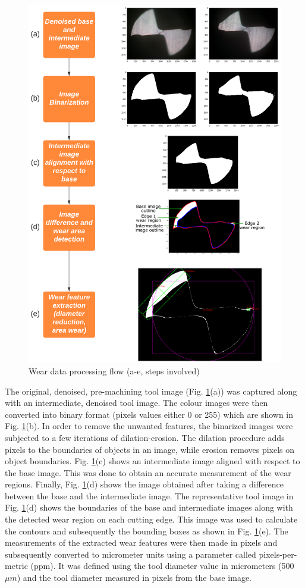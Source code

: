 \documentclass[preprint,review,12pt]{elsarticle}
\begin{document}
\begin{figure}[!h]
\begin{center}
\includegraphics[width=0.7\linewidth]{325.png}
\caption{Wear data processing flow (a-e, steps involved)}\label{fig:fig325}
\end{center}
\end{figure}

The original, denoised, pre-machining tool image (Fig. \ref{fig:fig325}(a)) was captured along with an intermediate, denoised tool image. The colour images were then converted into binary format (pixels values either 0 or 255) which are shown in Fig. \ref{fig:fig325}(b). In order to remove the unwanted features, the binarized images were subjected to a few iterations of dilation-erosion. The dilation procedure adds pixels to the boundaries of objects in an image, while erosion removes pixels on object boundaries. Fig. \ref{fig:fig325}(c) shows an intermediate image aligned with respect to the base image. This was done to obtain an accurate measurement of the wear regions. Finally, Fig. \ref{fig:fig325}(d) shows the image obtained after taking a difference between the base and the intermediate image. The representative tool image in Fig. \ref{fig:fig325}(d) shows the boundaries of the base and intermediate images along with the detected wear region on each cutting edge. This image was used to calculate the contours and subsequently the bounding boxes as shown in Fig. \ref{fig:fig325}(e). The measurements of the extracted wear features were then made in pixels and subsequently converted to micrometer units using a parameter called pixels-per-metric (ppm). It was defined using the tool diameter value in micrometers (500 $\mu{m}$) and the tool diameter measured in pixels from the base image. \par
\end{document}
